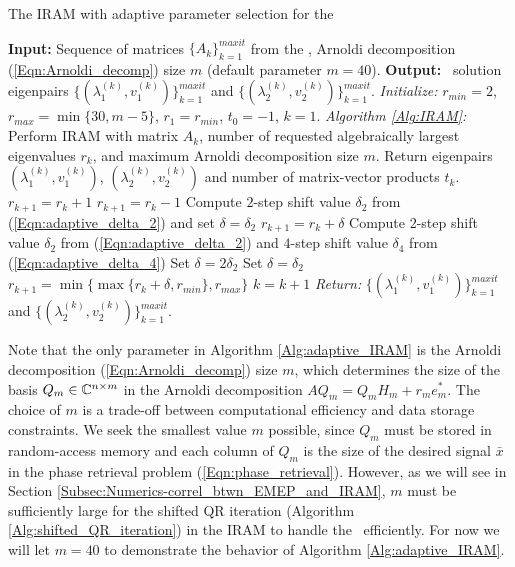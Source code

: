\begin{algorithm}[H]
\caption{The IRAM with adaptive parameter selection for the \emep}	\label{Alg:adaptive_IRAM}

\begin{algorithmic}[1]
	\Statex 	\textbf{Input:} Sequence of matrices $\{ A_k \}_{k=1}^{maxit}$ from the \emep, Arnoldi decomposition (\ref{Eqn:Arnoldi_decomp})  size $m$ (default parameter $m = 40$).
	\Statex 	\textbf{Output:} \emep \ solution eigenpairs $\{ (\lambda_1^{(k)}, v_1^{(k)}) \}_{k=1}^{maxit}$ and  $\{ (\lambda_2^{(k)}, v_2^{(k)}) \}_{k=1}^{maxit}$.
	\State		\textit{Initialize:} $r_{min}=2$, $r_{max} = \min\{ 30, m-5 \}$, $r_1=r_{min}$, $t_0=-1$, $k=1$.
		\State		\textit{Algorithm \ref{Alg:IRAM}:} Perform IRAM with matrix $A_k$, number of requested algebraically largest eigenvalues $r_k$, and maximum Arnoldi decomposition size $m$.  Return eigenpairs $(\lambda_1^{(k)}, v_1^{(k)} )$, $(\lambda_2^{(k)}, v_2^{(k)} )$ and number of matrix-vector products $t_k$.
			\State 		$r_{k+1} = r_k + 1$
			\State		$r_{k+1} = r_k - 1$
			\State		Compute $2$-step shift value $\delta_2$ from (\ref{Eqn:adaptive_delta_2}) and set $\delta = \delta_2$
			\State		$r_{k+1} = r_k + \delta$
		\Else
			\State 		Compute $2$-step shift value $\delta_2$ from (\ref{Eqn:adaptive_delta_2}) and $4$-step shift value $\delta_4$ from (\ref{Eqn:adaptive_delta_4})
				\State		Set $\delta = 2\delta_2$
			\Else
				\State 			Set $\delta = \delta_2$
			\EndIf
			\State		$r_{k+1} =\min \{ \max \{ r_k + \delta, r_{min} \}, r_{max} \}$
		\EndIf
		\State		$k = k+1$
	\EndWhile
	\State		\textit{Return:} $\{ (\lambda_1^{(k)}, v_1^{(k)}) \}_{k=1}^{maxit}$ and  $\{ (\lambda_2^{(k)}, v_2^{(k)}) \}_{k=1}^{maxit}$.
\end{algorithmic}

\end{algorithm}



Note that the only parameter in Algorithm \ref{Alg:adaptive_IRAM} is the Arnoldi decomposition (\ref{Eqn:Arnoldi_decomp}) size $m$, which determines the size of the basis $Q_m \in {\mathbb C}^{n \times m}$ in the Arnoldi decomposition $AQ_m = Q_mH_m + r_me_m^*$.  
The choice of $m$ is a trade-off between computational efficiency and data storage constraints.
We seek the smallest value $m$ possible, since $Q_m$ must be stored in random-access memory and each column of $Q_m$ is the size of the desired signal $\bar{x}$ in the phase retrieval problem (\ref{Eqn:phase_retrieval}).
However, as we will see in Section \ref{Subsec:Numerics-correl_btwn_EMEP_and_IRAM}, $m$ must be sufficiently large for the shifted QR iteration (Algorithm \ref{Alg:shifted_QR_iteration}) in the IRAM to handle the \emep \ efficiently.  
For now we will let $m=40$ to demonstrate the behavior of Algorithm \ref{Alg:adaptive_IRAM}.



